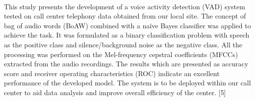 \paragraph{}This study presents the development of a voice activity detection (VAD) system tested on call center telephony data obtained from our local site. The concept of bag of audio words (BoAW) combined with a naïve Bayes classifier was applied to achieve the task. It was formulated as a binary classification problem with speech as the positive class and silence/background noise as the negative class. All the processing was performed on the Mel-frequency cepstral coefficients (MFCCs) extracted from the audio recordings. The results which are presented as accuracy score and receiver operating characteristics (ROC) indicate an excellent performance of the developed model. The system is to be deployed within our call center to aid data analysis and improve overall efficiency of the center. [5]

\newpage